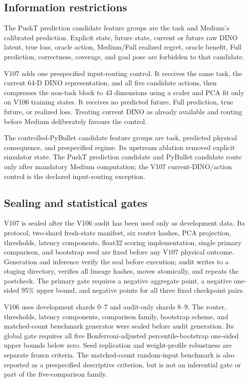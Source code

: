 \documentclass[10pt]{article}
\theoremstyle{definition}
\theoremstyle{remark}
\newcommand{\pusht}{PushT}
\newcommand{\pybullet}{PyBullet}
\begin{document}
\subsection{Information restrictions}
The \pusht{} prediction candidate feature groups are the task and
Medium's calibrated prediction.  Explicit state, future state, current or
future raw DINO latent, true loss, oracle action, Medium/Full realized regret,
oracle benefit, Full prediction, correctness, coverage, and goal pose are
forbidden to that candidate.

V107 adds one prespecified input-routing control.  It receives the same task,
the current 64-D DINO representation, and all five candidate actions, then
compresses the non-task block to 43 dimensions using a scaler and PCA fit only
on V106 training states.  It receives no predicted future, Full prediction,
true future, or realized loss.  Treating current DINO as already available and
routing before Medium deliberately favours the control.

The controlled-\pybullet{} candidate feature groups are task, predicted
physical consequence, and prespecified regime.  Its upstream ablation removed
explicit simulator state.  The PushT prediction candidate and PyBullet
candidate route only after mandatory Medium computation; the V107
current-DINO/action control is the declared input-routing exception.

\subsection{Sealing and statistical gates}
V107 is sealed after the V106 audit has been used only as development data.
Its protocol, two-shard fresh-state manifest, six router hashes, PCA projection,
thresholds, latency components, float32 scoring implementation, single primary
comparison, and bootstrap seed are fixed before any V107 physical outcome.
Generation and inference verify the seal before execution; audit writes to a
staging directory, verifies all lineage hashes, moves atomically, and repeats
the postcheck.  The primary gate requires a negative aggregate point, a
negative one-sided 95\% upper bound, and negative points for all three fixed
checkpoint pairs.

V106 uses development shards 0--7 and audit-only shards 8--9.  The router,
thresholds, latency components, comparison family, bootstrap scheme, and
matched-count benchmark generator were sealed before audit generation.  Its global gate
requires all five Bonferroni-adjusted percentile-bootstrap one-sided upper
bounds below zero.  Seed replication and weight-profile robustness are
separate frozen criteria.  The matched-count random-input benchmark is also
reported as a prespecified descriptive criterion, but is not an inferential
gate or part of the five-comparison family.
\end{document}
